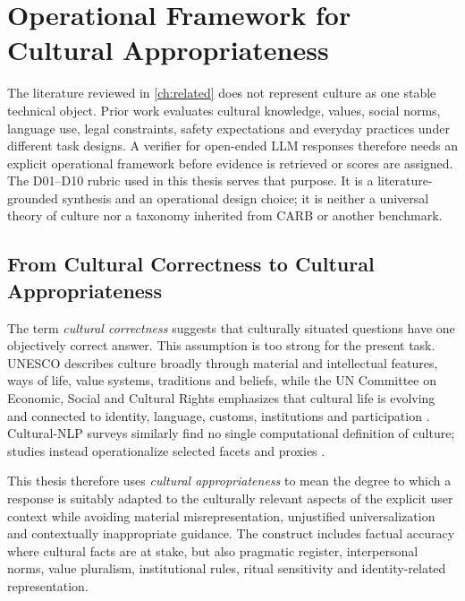 \chapter{Operational Framework for Cultural Appropriateness}
\label{ch:framework}

The literature reviewed in \cref{ch:related} does not represent culture as one stable technical object. Prior work evaluates cultural knowledge, values, social norms, language use, legal constraints, safety expectations and everyday practices under different task designs. A verifier for open-ended LLM responses therefore needs an explicit operational framework before evidence is retrieved or scores are assigned. The D01--D10 rubric used in this thesis serves that purpose. It is a literature-grounded synthesis and an operational design choice; it is neither a universal theory of culture nor a taxonomy inherited from CARB or another benchmark.

\section{From Cultural Correctness to Cultural Appropriateness}
\label{sec:correctness-to-appropriateness}

The term \emph{cultural correctness} suggests that culturally situated questions have one objectively correct answer. This assumption is too strong for the present task. UNESCO describes culture broadly through material and intellectual features, ways of life, value systems, traditions and beliefs, while the UN Committee on Economic, Social and Cultural Rights emphasizes that cultural life is evolving and connected to identity, language, customs, institutions and participation \parencite{unesco2001culturaldiversity,cescr2009gc21}. Cultural-NLP surveys similarly find no single computational definition of culture; studies instead operationalize selected facets and proxies \parencite{adilazuarda2024culture,liu2025culturallyaware,pawar2025culturalawareness}.

This thesis therefore uses \emph{cultural appropriateness} to mean the degree to which a response is suitably adapted to the culturally relevant aspects of the explicit user context while avoiding material misrepresentation, unjustified universalization and contextually inappropriate guidance. The construct includes factual accuracy where cultural facts are at stake, but also pragmatic register, interpersonal norms, value pluralism, institutional rules, ritual sensitivity and identity-related representation.

